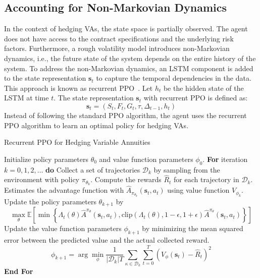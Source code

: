 \subsection{Accounting for Non-Markovian Dynamics}

In the context of hedging VAs, the state space is partially observed.
The agent does not have access to the contract specifications and the underlying risk factors.
Furthermore, a rough volatility model introduces non-Markovian dynamics, i.e., the future state of the system depends on the entire history of the system.
To address the non-Markovian dynamics, an LSTM component is added to the state representation $\mathbf{s}_t$ to capture the temporal dependencies in the data.
This approach is known as recurrent PPO~\citep{ni2021recurrent}.
Let $h_t$ be the hidden state of the LSTM at time $t$.
The state representation $\mathbf{s}_t$ with recurrent PPO is defined as:
\begin{equation}
    \mathbf{s}_t = (S_t, F_t, G_t, \tau, \Delta_{t-1}, h_t)
\end{equation}
Instead of following the standard PPO algorithm, the agent uses the recurrent PPO algorithm to learn an optimal policy for hedging VAs.

\begin{algorithm} 
    \caption{Recurrent PPO for Hedging Variable Annuities} 
    \begin{algorithmic}[1] \label{alg3:ppoHedging-rnn}
        \STATE  Initialize policy parameters $\theta_0$ and value function parameters $\phi_0$.
        \STATE  \textbf{For} {iteration $k=0, 1,2,\ldots$} \textbf{do}
        \STATE  \quad Collect a set of trajectories $\mathcal{D}_k$ by sampling from the environment with policy $\pi_{\theta_{k}}$.
        \STATE  \quad Compute the rewards $\hat{R}_t$ for each trajectory in $\mathcal{D}_k$.
        \STATE  \quad Estimates the advantage function with $\hat{A}_{\pi_{\theta_k}}(\mathbf{s}_t, a_t)$ using value function $V_{\phi_k}$.
        \STATE  \quad Update the policy parameters $\theta_{k+1}$ by 
        \begin{equation*}
            \max_{\theta} \mathbb{E}\left[ \min \left\{ \Lambda_t(\theta)\hat{A}^{\pi_{\theta}}(\mathbf{s}_t, a_t), \text{clip}(\Lambda_t(\theta), 1-\epsilon, 1 + \epsilon) \hat{A}^{\pi_{\theta}}(\mathbf{s}_t, a_t)  \right\} \right]
        \end{equation*}
        \STATE  \quad Update the value function parameters $\phi_{k+1}$ by minimizing the mean squared error between the predicted value and the actual collected reward.
        \begin{equation*}
            \phi_{k+1} = \arg \min_{\phi} \frac{1}{|\mathcal{D}_k|T} \sum_{\mathcal{\kappa} \in \mathcal{D}_k} \sum_{t=0}^{T} \left( V_{\phi}(\mathbf{s}_t) - \hat{R}_t \right)^2
        \end{equation*}
        \STATE  \textbf{End For}
    \end{algorithmic}
\end{algorithm}

